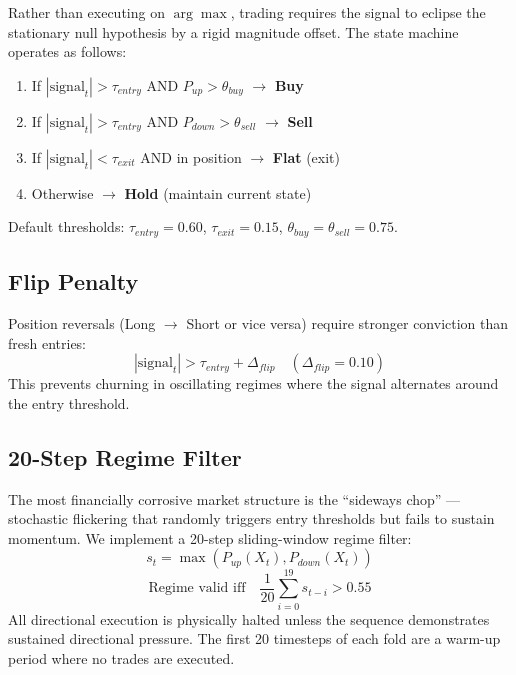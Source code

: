 \documentclass[conference]{IEEEtran}
\begin{document}
Rather than executing on $\arg\max$, trading requires the signal to eclipse
the stationary null hypothesis by a rigid magnitude offset. The state
machine operates as follows:

\begin{enumerate}
    \item If $|\text{signal}_t| > \tau_{entry}$ AND $P_{up} > \theta_{buy}$ $\rightarrow$ \textbf{Buy}
    \item If $|\text{signal}_t| > \tau_{entry}$ AND $P_{down} > \theta_{sell}$ $\rightarrow$ \textbf{Sell}
    \item If $|\text{signal}_t| < \tau_{exit}$ AND in position $\rightarrow$ \textbf{Flat} (exit)
    \item Otherwise $\rightarrow$ \textbf{Hold} (maintain current state)
\end{enumerate}

Default thresholds: $\tau_{entry}=0.60$, $\tau_{exit}=0.15$,
$\theta_{buy}=\theta_{sell}=0.75$.

\subsection{Flip Penalty}
Position reversals (Long $\rightarrow$ Short or vice versa) require
stronger conviction than fresh entries:
\begin{equation}
    |\text{signal}_t| > \tau_{entry} + \Delta_{flip} \quad (\Delta_{flip}=0.10)
\end{equation}
This prevents churning in oscillating regimes where the signal alternates
around the entry threshold.

\subsection{20-Step Regime Filter}
The most financially corrosive market structure is the ``sideways chop'' ---
stochastic flickering that randomly triggers entry thresholds but fails
to sustain momentum. We implement a 20-step sliding-window regime filter:
\begin{equation}
    s_t = \max(P_{up}(X_t), P_{down}(X_t))
\end{equation}
\begin{equation}
    \text{Regime valid iff} \quad \frac{1}{20}\sum_{i=0}^{19} s_{t-i} > 0.55
\end{equation}
All directional execution is physically halted unless the sequence
demonstrates sustained directional pressure. The first 20 timesteps
of each fold are a warm-up period where no trades are executed.
\end{document}
